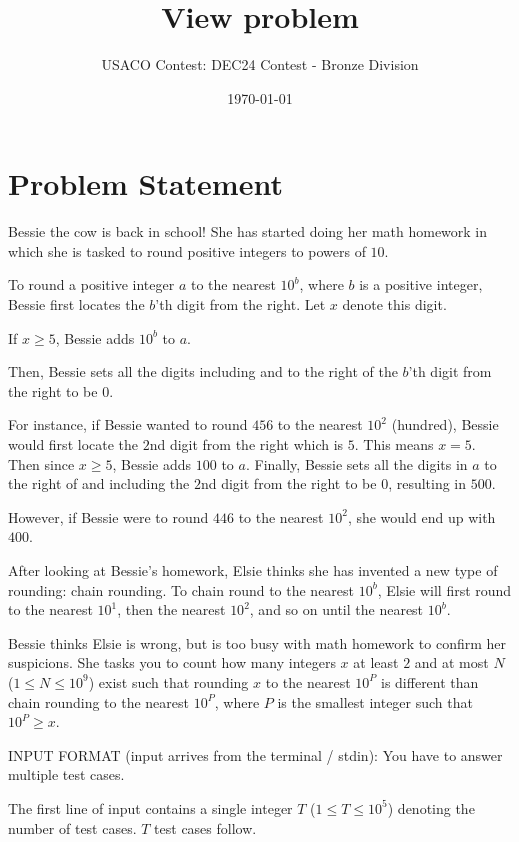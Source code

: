 \documentclass[12pt]{article}
\title{View problem}
\author{USACO Contest: DEC24 Contest - Bronze Division}
\date{\today}
\begin{document}
\maketitle

\section*{Problem Statement}


Bessie the cow is back in school!  She has started doing her math homework  in
which she is tasked to round positive integers to powers of $10$.

To round a positive integer $a$ to the nearest $10^b$, where $b$ is a positive
integer, Bessie first locates the $b$'th digit from the right. Let $x$ denote
this digit.

If $x \geq 5$, Bessie adds $10^b$ to $a$.

Then, Bessie sets all the digits including and to the right of the $b$'th digit
from the right to be $0$.

For instance, if Bessie wanted to round $456$ to the nearest $10^2$ (hundred),
Bessie would first locate the $2$nd digit from the right which is $5$. This
means $x = 5$. Then since $x \geq 5$, Bessie adds $100$ to $a$. Finally, Bessie
sets all the digits in $a$ to the right of and including the $2$nd digit from
the right to be $0$, resulting in $500$. 

However, if Bessie were to round $446$ to the nearest $10^2$, she would end up
with $400$.

After looking at Bessie's homework, Elsie thinks she has invented a new type of
rounding: chain rounding. To chain round to the nearest $10^b$, Elsie will first
round to the nearest $10^1$, then the nearest $10^2$, and so on until the
nearest $10^b$. 

Bessie thinks Elsie is wrong, but is too busy with math homework to confirm her
suspicions. She tasks you to count how many integers $x$ at least $2$ and at
most $N$ ($1 \leq N \leq 10^{9}$) exist such that rounding $x$ to the nearest
$10^P$ is different than chain rounding to the nearest $10^P$, where $P$ is the
smallest integer such that $10^P \geq x$.

INPUT FORMAT (input arrives from the terminal / stdin):
You have to answer multiple test cases.

The first line of input contains a single integer $T$ ($1 \leq T \leq 10^5$)
denoting the number of test cases. $T$ test cases follow.
\end{document}
